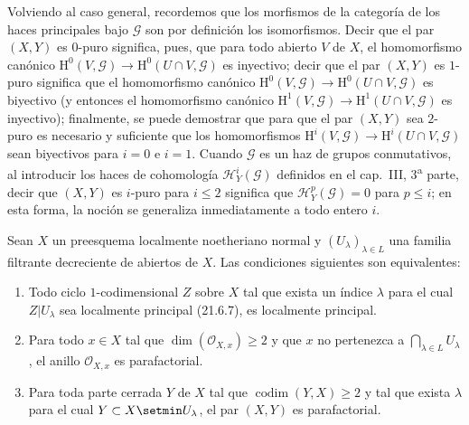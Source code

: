 \begin{remark}[21.13.13]
Volviendo al caso general, recordemos que los morfismos de la categoría de los haces
principales bajo $\mathscr G$ son por definición los isomorfismos. Decir que el par
$(X,Y)$ es $0$-puro significa, pues, que para todo abierto $V$ de $X$, el homomorfismo
canónico $\mathrm H^0(V,\mathscr G)\to\mathrm H^0(U\cap V,\mathscr G)$ es inyectivo;
decir que el par $(X,Y)$ es $1$-puro significa que el homomorfismo canónico
$\mathrm H^0(V,\mathscr G)\to\mathrm H^0(U\cap V,\mathscr G)$ es biyectivo (y entonces
el homomorfismo canónico
$\mathrm H^1(V,\mathscr G)\to\mathrm H^1(U\cap V,\mathscr G)$ es inyectivo); finalmente,
se puede demostrar que para que el par $(X,Y)$ sea $2$-puro es necesario y suficiente que
los homomorfismos
$\mathrm H^i(V,\mathscr G)\to\mathrm H^i(U\cap V,\mathscr G)$ sean biyectivos para
$i=0$ e $i=1$. Cuando $\mathscr G$ es un haz de grupos conmutativos, al
introducir los haces de cohomología $\mathscr H_Y^i(\mathscr G)$ definidos en el
cap.~III, 3\textsuperscript{a} parte, decir que $(X,Y)$ es $i$-puro para $i\leq2$
significa que $\mathscr H_Y^p(\mathscr G)=0$ para $p\leq i$; en esta forma, la
noción se generaliza inmediatamente a todo entero $i$.
\end{remark}

\begin{proposition}[21.13.14]
\label{IV.21.13.14}
Sean $X$ un preesquema localmente noetheriano normal y
$(U_\lambda)_{\lambda\in L}$ una familia filtrante decreciente de abiertos de $X$. Las
condiciones siguientes son equivalentes:
\begin{enumerate}[label=\emph{\alph*)}]
  \item Todo ciclo $1$-codimensional $Z$ sobre $X$ tal que exista un índice
  $\lambda$ para el cual $Z|U_\lambda$ sea localmente principal \textup{(21.6.7)}, es
  localmente principal.
  \item Para todo $x\in X$ tal que $\dim(\mathcal O_{X,x})\geq2$ y que $x$
  no pertenezca a $\bigcap_{\lambda\in L}U_\lambda$, el anillo
  $\mathcal O_{X,x}$ es parafactorial.
  \item[\textup{b$'$)}] Para toda parte cerrada $Y$ de $X$ tal que
$\operatorname{codim}(Y,X)\geq2$ y tal que exista $\lambda$ para el cual
$Y\subset X\setmin U_\lambda$, el par $(X,Y)$ es parafactorial.
\end{enumerate}
\end{proposition}


